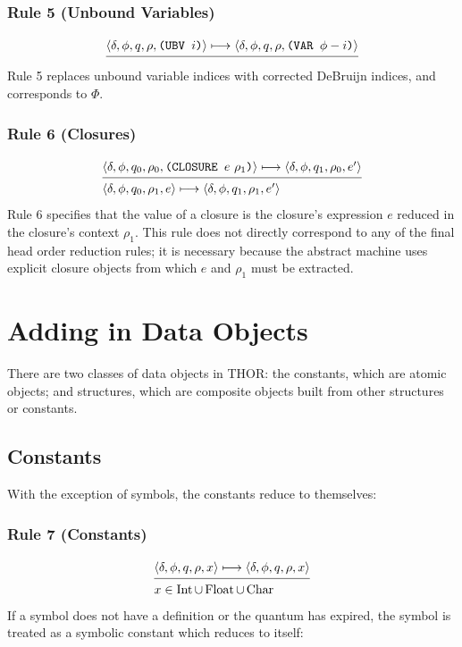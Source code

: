 \subsubsection*{Rule 5 (Unbound Variables)}
\[
\semanticrule{
\cfg{\delta}{\phi}{q}{\rho}{\THOR{(UBV }i\THOR{)}}\redsto
\cfg{\delta}{\phi}{q}{\rho}{\THOR{(VAR }\phi-i\THOR{)}}
}{

}
\]
Rule 5 replaces unbound variable indices with corrected DeBruijn indices, and
corresponds to \(\Phi\).

\subsubsection*{Rule 6 (Closures)}
\[
\semanticrule{
\cfg{\delta}{\phi}{q_0}{\rho_0}{\THOR{(CLOSURE }e\ \rho_1\THOR{)}}\redsto
\cfg{\delta}{\phi}{q_1}{\rho_0}{e'}
}{
\cfg{\delta}{\phi}{q_0}{\rho_1}{e}\redsto
\cfg{\delta}{\phi}{q_1}{\rho_1}{e'}
}
\]
Rule 6 specifies that the value of a closure is the closure's expression \(e\)
reduced in the closure's context \(\rho_1\). This rule does not directly
correspond to any of the final head order reduction rules; it is necessary
because the abstract machine uses explicit closure objects from which \(e\) and
\(\rho_1\) must be extracted.

\section{Adding in Data Objects}

There are two classes of data objects in THOR: the constants, which are atomic
objects; and structures, which are composite objects built from other structures
or constants.

\subsection{Constants}

With the exception of symbols, the constants reduce to themselves:

\subsubsection*{Rule 7 (Constants)}
\[
\semanticrule{
\cfg{\delta}{\phi}{q}{\rho}{x}\redsto
      \cfg{\delta}{\phi}{q}{\rho}{x}
}{
x\in \Int\cup\Float\cup\Char
}
\]
If a symbol does not have a definition or the quantum has expired, the symbol is
treated as a symbolic constant which reduces to itself:


